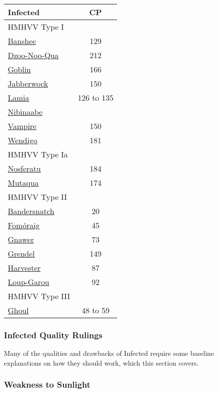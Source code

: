 \begin{multicols*}{3}
	
	\begin{center}
		\begin{tabularx}{0.32\textwidth}{|X|c|}
			\hline
			Infected & CP \\
			\hline
			\hline
			HMHVV Type I & \\
			\hline
			\hyperref[banshee]{Banshee} & 129 \\
			\hyperref[dzoo-noo-qua]{Dzoo-Noo-Qua} & 212 \\
			\hyperref[goblin]{Goblin} & 166 \\
			\hyperref[jabberwock]{Jabberwock} & 150 \\
			\hyperref[lamia]{Lamia} & 126 to 135 \\
			\hyperref[nibinaabe]{Nibinaabe} & \\
			\hyperref[vampire]{Vampire} & 150 \\
			\hyperref[wendigo]{Wendigo} & 181 \\
			\hline
			\hline
			HMHVV Type Ia & \\
			\hline
			\hyperref[nosferatu]{Nosferatu} & 184 \\
			\hyperref[mutaqua]{Mutaqua} & 174 \\
			\hline
			\hline
			HMHVV Type II & \\
			\hline
			\hyperref[bandersnatch]{Bandersnatch} & 20 \\
			\hyperref[formoraig]{Fomóraig} & 45 \\
			\hyperref[gnawer]{Gnawer} & 73 \\
			\hyperref[grendel]{Grendel} & 149 \\
			\hyperref[harvester]{Harvester} & 87 \\
			\hyperref[loup-garou]{Loup-Garou} & 92 \\
			\hline
			\hline
			HMHVV Type III & \\
			\hline
			\hyperref[ghoul]{Ghoul} & 48 to 59 \\
			\hline
		\end{tabularx}
	\end{center}
	
	\subsubsection{Infected Quality Rulings}
	
	Many of the qualities and drawbacks of Infected require some baseline explanations on how they should work, which this section covers.
	
	\subsubsection*{Weakness to Sunlight}\label{sunlight}
	

\end{multicols*}
